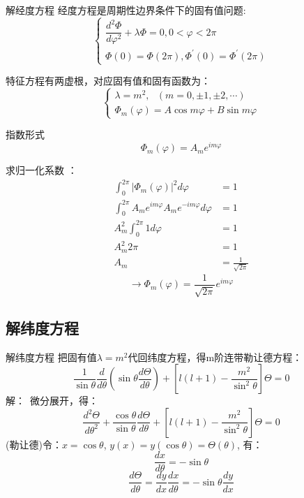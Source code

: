 	{解经度方程}
	经度方程是周期性边界条件下的固有值问题:\\
	\[\begin{cases}
		\dfrac{d^{2} \Phi}{d \varphi^{2}}+\lambda \Phi=0,0<\varphi<2 \pi \\ 
		\Phi(0)=\Phi(2 \pi), \Phi^{\prime}(0)=\Phi^{\prime}(2 \pi)
	\end{cases}\]
	
	特征方程有两虚根，对应固有值和固有函数为：
	\[\begin{cases}
		\lambda=m^2, ~~~ (m=0,\pm 1,\pm 2,\cdots) \\ 
		\Phi_m (\varphi)=A\cos m\varphi+B\sin m\varphi
	\end{cases}\]
	
	指数形式
	\begin{equation*}
		\Phi_m (\varphi)=A_m e^{im\varphi}
	\end{equation*}	
	


	求归一化系数 ：
	\begin{equation*}
	\begin{split}
		\int_{0}^{2\pi}  |\Phi_m (\varphi)|^2 d\varphi &= 1 \\
		\int_{0}^{2\pi}  A_m e^{im\varphi} A_m e^{-im\varphi} d\varphi &= 1 \\
		A^2_m \int_{0}^{2\pi} 1 d\varphi &= 1 \\
		A^2_m 2\pi &= 1 \\
		A_m&=\frac{1}{\sqrt{2\pi}} 
	\end{split}
	\end{equation*}	
	\begin{equation*}
	\to 	\Phi_m (\varphi)=\frac{1}{\sqrt{2\pi}} e^{im\varphi}
	\end{equation*}	
	

\subsection{解纬度方程}

	{解纬度方程}
	把固有值$\lambda=m^2$代回纬度方程，得m阶连带勒让德方程：
	\begin{equation*}
		\boxed{\frac{1}{\sin \theta} \frac{d}{d \theta}\left(\sin \theta \frac{d \Theta}{d \theta}\right)+\left[l(l+1)-\frac{m^{2}}{\sin ^{2} \theta}\right] \Theta=0}
	\end{equation*}	
	{\alert{解：}}~微分展开，得：
	\begin{equation*}
		\frac{d^{2} \Theta}{d \theta^{2}}+\frac{\cos \theta}{\sin \theta} \frac{d \Theta}{d \theta}+\left[l(l+1)-\frac{m^{2}}{\sin ^{2} \theta}\right] \Theta=0
	\end{equation*}		
	(勒让德)令：$x=\cos \theta$,  $y(x)= y(\cos \theta) =\Theta (\theta)$, 有：
	\begin{equation*}
		\frac{d x}{d  \theta} =-\sin \theta  
	\end{equation*}		
	\begin{equation*}
		\frac{d \Theta}{d \theta} =\frac{d y}{d x}\frac{d x}{d \theta} =-\sin \theta \frac{d y}{d x}
	\end{equation*}		
	


